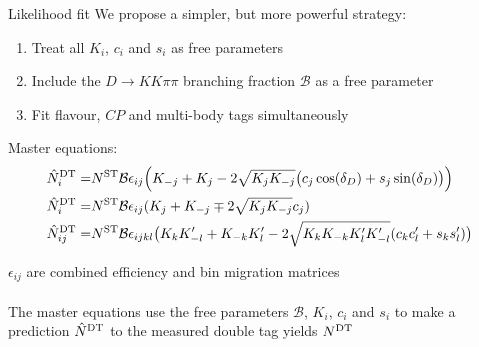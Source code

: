 \documentclass{beamer}
\begin{document}
\begin{frame}{Likelihood fit}
  \vspace{0.0cm}
  {\Large We propose a simpler, but more powerful strategy:}
  \begin{enumerate}
    \item{Treat all $K_i$, $c_i$ and $s_i$ as free parameters}
    \item{Include the $D\to KK\pi\pi$ branching fraction $\mathcal{B}$ as a free parameter}
    \item{Fit flavour, $C\!P$ and multi-body tags simultaneously}
  \end{enumerate}
  \begin{center}
    {\Large Master equations:}
    \begin{align*}
      \hat{N}^{\rm DT}_i =& N^{\rm ST}\mathcal{B}\epsilon_{ij}\Big(K_{-j} + K_j - 2\sqrt{K_jK_{-j}}\big(c_j\cos(\delta_D) + s_j\sin(\delta_D)\big)\Big) \\
      \hat{N}^{\rm DT}_i =& N^{\rm ST}\mathcal{B}\epsilon_{ij}(K_j + K_{-j} \mp 2\sqrt{K_jK_{-j}}c_j) \\
      \hat{N}^{\rm DT}_{ij} =& N^{\rm ST}\mathcal{B}\epsilon_{ijkl}\big(K_{k}K_{-l}^\prime + K_{-k}K_{l}^\prime - 2\sqrt{K_{k}K_{-k}K_{l}^\prime K_{-l}^\prime}(c_{k}c_{l}^\prime + s_{k}s_{l}^\prime)\big)
    \end{align*}
  \end{center}
  \begin{center}
    $\epsilon_{ij}$ are combined efficiency and bin migration matrices\\~\\
    {\large The master equations use the free parameters $\mathcal{B}$, $K_i$, $c_i$ and $s_i$ to make a prediction $\hat{N}^{\rm DT}$ to the measured double tag yields $N^{\rm DT}$}
  \end{center}
\end{frame}
\end{document}
